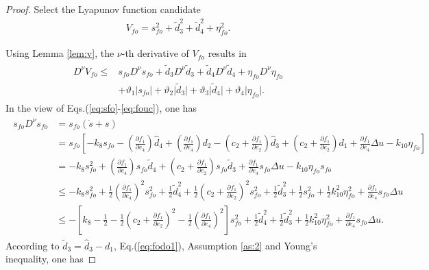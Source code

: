 \documentclass[ShortAfour]{sage}
\theoremstyle{plain}
\theoremstyle{remark}
\begin{document}
\begin{proof}
  Select the Lyapunov function candidate
  \begin{align}
    V_{fo}=s_{fo}^2+\tilde d_3^2+\tilde d_4^2+\eta_{fo}^2.\label{eq:vfo}
  \end{align}

  Using Lemma \ref{lem:v}, the $\nu$-th derivative of $V_{fo}$ results in
  \begin{align}\begin{split}
    D^\nu V_{fo}\le& s_{fo}D^\nu s_{fo}+\tilde d_3D^\nu \tilde d_3+\tilde d_4D^\nu \tilde d_4+\eta_{fo}D^\nu \eta_{fo}
    \\&+\vartheta_1\vert s_{fo}\vert+\vartheta_2\vert \tilde d_3\vert+\vartheta_3\vert \tilde d_4\vert+\vartheta_4\vert \eta_{fo}\vert.\label{eq:Dv}
  \end{split}\end{align}
  In the view of Eqs.(\ref{eq:sfo}-\ref{eq:fouc}), one has
  \begin{align}\begin{split}
    s_{fo}D^\nu s_{fo}&=s_{fo}(\dot s+s)\\
    &=s_{fo}\left[-k_8s_{fo}-\left(\frac{\partial f_1}{\partial e_4}\right)\hat d_4+\left(\frac{\partial f_1}{\partial e_4}\right)d_2-\left(c_2+\frac{\partial f_1}{\partial e_2}\right)\hat d_3+\left(c_2+\frac{\partial f_1}{\partial e_2}\right)d_1+\frac{\partial f_1}{\partial e_4}\Delta u-k_{10}\eta_{fo}\right]\\
    &=-k_8s_{fo}^2+\left(\frac{\partial f_1}{\partial e_4}\right)s_{fo}\tilde d_4 +\left(c_2+\frac{\partial f_1}{\partial e_2}\right)s_{fo}\tilde d_3+\frac{\partial f_1}{\partial e_4}s_{fo}\Delta u-k_{10}\eta_{fo} s_{fo}\\
    &\le -k_8s_{fo}^2+\frac{1}{2}\left(\frac{\partial f_1}{\partial e_4}\right)^2s_{fo}^2+\frac{1}{2}\tilde d_4^2+\frac{1}{2}\left(c_2+\frac{\partial f_1}{\partial e_2}\right)^2s_{fo}^2+\frac{1}{2}\tilde d_3^2+\frac{1}{2}s_{fo}^2+\frac{1}{2}k_{10}^2\eta_{fo}^2+\frac{\partial f_1}{\partial e_4}s_{fo}\Delta u\\
    &\le -\left[k_8-\frac{1}{2}-\frac{1}{2}\left(c_2+\frac{\partial f_1}{\partial e_2}\right)^2-\frac{1}{2}\left(\frac{\partial f_1}{\partial e_4}\right)^2\right]s_{fo}^2+\frac{1}{2}\tilde d_4^2+\frac{1}{2}\tilde d_3^2+\frac{1}{2}k_{10}^2\eta_{fo}^2+\frac{\partial f_1}{\partial e_4}s_{fo}\Delta u.\label{eq:sDs}
  \end{split}\end{align}
  According to $\tilde d_3 = \hat d_3 - d_1$, Eq.(\ref{eq:fodo1}), Assumption \ref{as:2} and Young's inequality, one has

\end{proof}
\end{document}

